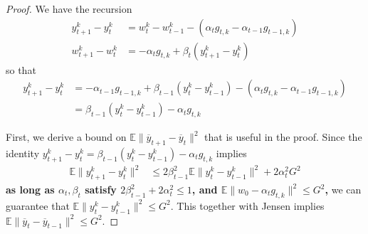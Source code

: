\begin{proof}
	We have the recursion 
	\begin{align*}
	y_{t+1}^{k}-y_{t}^{k} & =w_{t}^{k}-w_{t-1}^{k}-(\alpha_{t}g_{t,k}-\alpha_{t-1}g_{t-1,k})\\
	w_{t+1}^{k}-w_{t}^{k} & =-\alpha_{t}g_{t,k}+\beta_{t}(y_{t+1}^{k}-y_{t}^{k})
	\end{align*}
	so that 
	\begin{align*}
	y_{t+1}^{k}-y_{t}^{k} & =-\alpha_{t-1}g_{t-1,k}+\beta_{t-1}(y_{t}^{k}-y_{t-1}^{k})-(\alpha_{t}g_{t,k}-\alpha_{t-1}g_{t-1,k})\\
	& =\beta_{t-1}(y_{t}^{k}-y_{t-1}^{k})-\alpha_{t}g_{t,k}
	\end{align*}
	
	First, we derive a bound on $\mathbb{E}\|\overline{y}_{t+1}-\overline{y}_{t}\|^{2}$
	that is useful in the proof. Since the identity $y_{t+1}^{k}-y_{t}^{k}=\beta_{t-1}(y_{t}^{k}-y_{t-1}^{k})-\alpha_{t}g_{t,k}$
	implies 
	\begin{align*}
	\mathbb{E}\|y_{t+1}^{k}-y_{t}^{k}\|^{2} & \leq2\beta_{t-1}^{2}\mathbb{E}\|y_{t}^{k}-y_{t-1}^{k}\|^{2}+2\alpha_{t}^{2}G^{2}
	\end{align*}
	\textbf{as long as $\alpha_{t},\beta_{t}$ satisfy $2\beta_{t-1}^{2}+2\alpha_{t}^{2}\leq1$,
		and $\mathbb{E}\|w_{0}-\alpha_{t}g_{t,k}\|^{2}\leq G^{2}$,} we can
	guarantee that $\mathbb{E}\|y_{t}^{k}-y_{t-1}^{k}\|^{2}\leq G^{2}$.
	This together with Jensen implies $\mathbb{E}\|\overline{y}_{t}-\overline{y}_{t-1}\|^{2}\leq G^{2}$. 
	

\end{proof}
